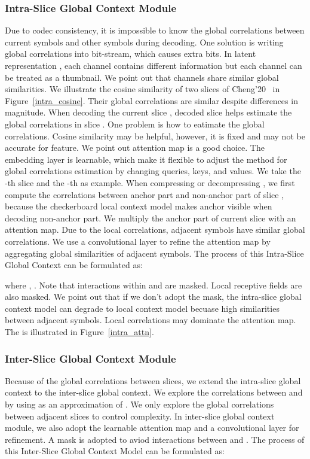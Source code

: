 \documentclass[sigconf]{acmart}
\begin{document}
\subsubsection{Intra-Slice Global Context Module}
Due to codec consistency, it is impossible to know the global correlations
between current symbols and other symbols during decoding.
One solution is writing global correlations into bit-stream,
which causes extra bits.
In latent representation , each channel contains different information
but each channel can be treated as a thumbnail.
We point out that channels share similar global similarities.
We illustrate the cosine similarity of two slices
of Cheng'20~\cite{DBLP:conf/cvpr/ChengSTK20} in Figure~\ref{intra_cosine}.
Their global correlations are similar despite differences in magnitude.
When decoding the current slice , decoded slice
 helps estimate the global correlations
in slice .
One problem is how to eatimate the global correlations.
Cosine similarity may be helpful, however, it is fixed and may not be accurate for feature.
We point out attention map is a good choice.
The embedding layer is learnable, which make it flexible
to adjust the method for global correlations estimation by changing queries, keys, and values.
We take the -th slice and the -th as example.
When compressing or decompressing ,
we first compute the correlations between anchor part 
and non-anchor part  of slice ,
because the checkerboard local context model makes anchor visible when decoding non-anchor part.
We multiply the anchor part of current slice  with
an attention map.
Due to the local correlations, adjacent symbols have similar global correlations.
We use a  convolutional layer to refine the attention
map by aggregating global similarities of adjacent symbols.
The process of this Intra-Slice Global Context  can be formulated as:



where , .
Note that interactions within  and 
are masked. Local receptive fields are also masked.
We point out that if we don't adopt the mask, the intra-slice global context model
can degrade to local context model becuase high similarities between adjacent symbols.
Local correlations may dominate the attention map.
The  is illustrated in Figure~\ref{intra_attn}.
\subsubsection{Inter-Slice Global Context Module}
Because of the global correlations between slices,
we extend the intra-slice global context to the inter-slice global context.
We explore the correlations between  and 
by using  as an approximation of .
We only explore the global correlations between adjacent slices to control complexity.
In inter-slice global context module, we also adopt
the learnable attention map and a convolutional layer for refinement.
A mask is adopted to aviod interactions between  and .
The process of this Inter-Slice Global Context Model  can be formulated as:
\end{document}
